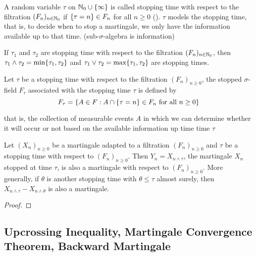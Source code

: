 \documentclass{report}
\begin{document}
\begin{definition}
	A random variable $\tau$ on $\mathbb{N}_0 \cup \{\infty\}$ is called stopping time with respect to the filtration $(F_n)_{n \in \mathbb{N}_0}$ if $\{\tau = n\} \in F_n$ for all $n \geq 0$ (). $\tau$ models the stopping time, that is, to decide when to stop a martingale, we only have the information available up to that time. (sub-$\sigma$-algebra is information)
\end{definition}

\begin{proposition}
	If $\tau_1$ and $\tau_2$ are stopping time with respect to the filtration $(F_n)_{n \in \mathbb{N}_0}$, then $\tau_1 \wedge \tau_2 = \min\{\tau_1, \tau_2\}$ and $\tau_1 \vee \tau_2 = \max\{\tau_1, \tau_2\}$ are stopping times.
\end{proposition}

\begin{definition}
	Let $\tau$ be a stopping time with respect to the filtration $(F_n)_{n \geq 0}$, the stopped $\sigma$-field $F_\tau$ associated with the stopping time $\tau$ is defined by
	$$
		F_\tau = \{A \in F: A \cap \{\tau = n\} \in F_n \text{ for all } n \geq 0\}
	$$
	
	that is, the collection of measurable events $A$ in which we can determine whether it will occur or not based on the available information up time time $\tau$
\end{definition}

\begin{lemma}
	Let $(X_n)_{n \geq 0}$ be a martingale adapted to a filtration $(F_n)_{n \geq 0}$ and $\tau$ be a stopping time with respect to $(F_n)_{n \geq 0}$. Then $Y_n = X_{n \wedge \tau}$, the martingale $X_n$ stopped at time $\tau$, is also a martingale with respect to $(F_n)_{n \geq 0}$. More generally, if $\theta$ is another stopping time with $\theta \leq \tau$ almost surely, then $X_{n \wedge \tau} - X_{n \wedge \theta}$ is also a martingale.
\begin{proof}
\end{proof}
\end{lemma}

\subsection{Upcrossing Inequality, Martingale Convergence Theorem, Backward Martingale}
\end{document}
